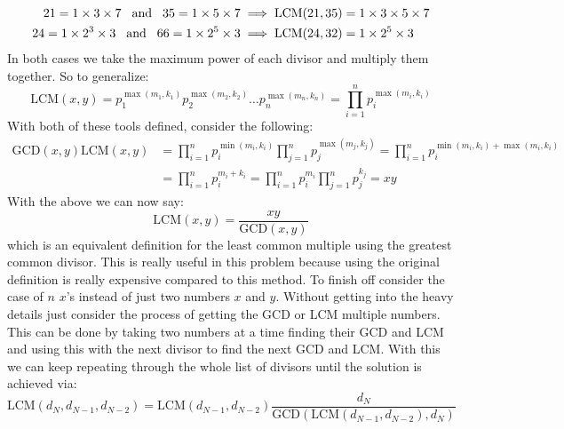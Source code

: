 \documentclass[12pt, letterpaper, onecolumn, conference, final]{IEEEtran}
\theoremstyle{definition}
\theoremstyle{plain}
\begin{document}
\begin{equation*}
\begin{split}
21 = 1 \times 3 \times 7 \hspace{.3cm} \text{and} \hspace{.3cm} 35 = 1 \times 5 \times 7 &\implies \text{LCM}(21, 35) = 1 \times 3 \times 5 \times 7 \\
24 = 1 \times 2^3 \times 3 \hspace{.3cm} \text{and} \hspace{.3cm} 66 = 1 \times 2^5 \times 3 &\implies \text{LCM}(24, 32) = 1 \times 2^5 \times 3
\end{split}
\end{equation*}
In both cases we take the maximum power of each divisor and multiply them together. So to generalize:
\begin{equation*}
\text{LCM}(x,y) = p_1^{\max(m_1,k_1)} p_2^{\max(m_2,k_2)} \dots p_n^{\max(m_n,k_n)} = \prod_{i=1}^n p_i^{\max(m_i,k_i)}
\end{equation*}
With both of these tools defined, consider the following:
\begin{equation*}
\begin{split}
\text{GCD}(x,y) \text{LCM}(x,y) &= \prod_{i=1}^n p_i^{\min(m_i,k_i)} \prod_{j=1}^n p_j^{\max(m_j,k_j)} = \prod_{i=1}^n p_i^{\min(m_i,k_i)+\max(m_i,k_i)} \\
&= \prod_{i=1}^n p_i^{m_i + k_i} = \prod_{i=1}^n p_i^{m_i} \prod_{j=1}^n p_j^{k_j} = xy
\end{split}
\end{equation*}
With the above we can now say:
\begin{equation*}
\text{LCM}(x,y) = \frac{xy}{\text{GCD}(x,y)}
\end{equation*}
which is an equivalent definition for the least common multiple using the greatest common divisor. This is really useful in this problem because using the original definition is really expensive compared to this method. To finish off consider the case of $n$ $x$'s instead of just two numbers $x$ and $y$. Without getting into the heavy details just consider the process of getting the GCD or LCM multiple numbers. This can be done by taking two numbers at a time finding their GCD and LCM and using this with the next divisor to find the next GCD and LCM. With this we can keep repeating through the whole list of divisors until the solution is achieved via:
\begin{equation*}
\text{LCM}(d_N,d_{N-1},d_{N-2}) = \text{LCM}(d_{N-1},d_{N-2}) \frac{d_N}{\text{GCD}(\text{LCM}(d_{N-1},d_{N-2}),d_N)}
\end{equation*}

\end{document}
